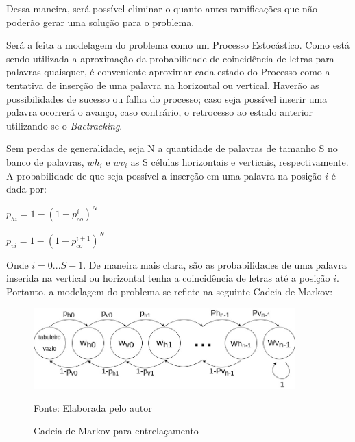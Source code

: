 Dessa maneira, será possível eliminar o quanto antes ramificações que não poderão gerar uma solução para o problema.

Será a feita a modelagem do problema como um Processo Estocástico. Como está sendo utilizada a aproximação da probabilidade de coincidência de letras para palavras quaisquer,
é conveniente aproximar cada estado do Processo como a tentativa de inserção de uma palavra na horizontal ou vertical. Haverão as possibilidades de sucesso ou falha do processo; caso seja possível inserir uma palavra ocorrerá o avanço, caso contrário, o retrocesso ao estado anterior utilizando-se o \textit{Bactracking}. 

Sem perdas de generalidade, seja N a quantidade de palavras de tamanho S no banco de palavras, $wh_{i}$ e $wv_{i}$ as S células horizontais e verticais, respectivamente. A probabilidade de que seja possível a inserção em uma palavra na posição $i$ é dada por:

\begin{center}
    \Large{$p_{hi} = 1 - (1 - p_{co}^{i})^{N}$}
    
    \Large{$p_{vi} = 1 - (1 - p_{co}^{i+1})^{N}$}
\end{center}

Onde $i = 0...S-1$. De maneira mais clara, são as probabilidades de uma palavra inserida na vertical ou horizontal tenha a coincidência de letras até a posição $i$. Portanto, a modelagem do problema se reflete na seguinte Cadeia de Markov:

\begin{figure}[H]
\centering
    \caption{Cadeia de Markov para entrelaçamento}
    \label{fig:markov1}
    \includegraphics[width=0.9\textwidth]{Figuras/markovChain1.jpg}
    
    Fonte: Elaborada pelo autor
\end{figure}


